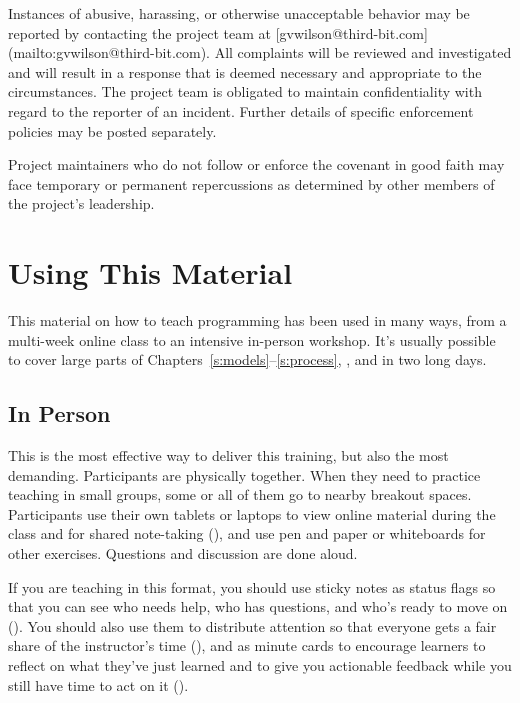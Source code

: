 Instances of abusive, harassing, or otherwise unacceptable behavior
may be reported by contacting the project team at
[gvwilson@third-bit.com](mailto:gvwilson@third-bit.com).  All
complaints will be reviewed and investigated and will result in a
response that is deemed necessary and appropriate to the
circumstances. The project team is obligated to maintain
confidentiality with regard to the reporter of an incident.  Further
details of specific enforcement policies may be posted separately.

Project maintainers who do not follow or enforce the covenant in good
faith may face temporary or permanent repercussions as determined by
other members of the project's leadership.

\section{Using This Material}\label{s:joining-using}

This material on how to teach programming has been used in many ways,
from a multi-week online class to an intensive in-person workshop.
It's usually possible to cover large parts of
Chapters~\ref{s:models}--\ref{s:process}, , and
 in two long days.

\subsection*{In Person}

This is the most effective way to deliver this training, but also the
most demanding.  Participants are physically together. When they need
to practice teaching in small groups, some or all of them go to nearby
breakout spaces.  Participants use their own tablets or laptops to
view online material during the class and for shared note-taking
(), and use pen and paper or
whiteboards for other exercises.  Questions and discussion are done
aloud.

If you are teaching in this format, you should use sticky notes as
status flags so that you can see who needs help, who has questions,
and who's ready to move on ().  You
should also use them to distribute attention so that everyone gets a
fair share of the instructor's time (),
and as minute cards to encourage learners to reflect on what they've
just learned and to give you actionable feedback while you still have
time to act on it ().

